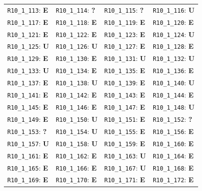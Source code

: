\begin{longtable}{llll}
\texttt{R10\_1\_113}: \textbf{E} & \texttt{R10\_1\_114}: \textbf{?} & \texttt{R10\_1\_115}: \textbf{?} & \texttt{R10\_1\_116}: \textbf{U} \\
\texttt{R10\_1\_117}: \textbf{E} & \texttt{R10\_1\_118}: \textbf{E} & \texttt{R10\_1\_119}: \textbf{E} & \texttt{R10\_1\_120}: \textbf{E} \\
\texttt{R10\_1\_121}: \textbf{E} & \texttt{R10\_1\_122}: \textbf{E} & \texttt{R10\_1\_123}: \textbf{E} & \texttt{R10\_1\_124}: \textbf{U} \\
\texttt{R10\_1\_125}: \textbf{U} & \texttt{R10\_1\_126}: \textbf{U} & \texttt{R10\_1\_127}: \textbf{E} & \texttt{R10\_1\_128}: \textbf{E} \\
\texttt{R10\_1\_129}: \textbf{E} & \texttt{R10\_1\_130}: \textbf{E} & \texttt{R10\_1\_131}: \textbf{U} & \texttt{R10\_1\_132}: \textbf{U} \\
\texttt{R10\_1\_133}: \textbf{U} & \texttt{R10\_1\_134}: \textbf{E} & \texttt{R10\_1\_135}: \textbf{E} & \texttt{R10\_1\_136}: \textbf{E} \\
\texttt{R10\_1\_137}: \textbf{E} & \texttt{R10\_1\_138}: \textbf{U} & \texttt{R10\_1\_139}: \textbf{E} & \texttt{R10\_1\_140}: \textbf{U} \\
\texttt{R10\_1\_141}: \textbf{E} & \texttt{R10\_1\_142}: \textbf{E} & \texttt{R10\_1\_143}: \textbf{E} & \texttt{R10\_1\_144}: \textbf{E} \\
\texttt{R10\_1\_145}: \textbf{E} & \texttt{R10\_1\_146}: \textbf{E} & \texttt{R10\_1\_147}: \textbf{E} & \texttt{R10\_1\_148}: \textbf{U} \\
\texttt{R10\_1\_149}: \textbf{E} & \texttt{R10\_1\_150}: \textbf{U} & \texttt{R10\_1\_151}: \textbf{E} & \texttt{R10\_1\_152}: \textbf{?} \\
\texttt{R10\_1\_153}: \textbf{?} & \texttt{R10\_1\_154}: \textbf{U} & \texttt{R10\_1\_155}: \textbf{E} & \texttt{R10\_1\_156}: \textbf{E} \\
\texttt{R10\_1\_157}: \textbf{U} & \texttt{R10\_1\_158}: \textbf{U} & \texttt{R10\_1\_159}: \textbf{E} & \texttt{R10\_1\_160}: \textbf{E} \\
\texttt{R10\_1\_161}: \textbf{E} & \texttt{R10\_1\_162}: \textbf{E} & \texttt{R10\_1\_163}: \textbf{U} & \texttt{R10\_1\_164}: \textbf{E} \\
\texttt{R10\_1\_165}: \textbf{E} & \texttt{R10\_1\_166}: \textbf{E} & \texttt{R10\_1\_167}: \textbf{U} & \texttt{R10\_1\_168}: \textbf{E} \\
\texttt{R10\_1\_169}: \textbf{E} & \texttt{R10\_1\_170}: \textbf{E} & \texttt{R10\_1\_171}: \textbf{E} & \texttt{R10\_1\_172}: \textbf{E} \\

\end{longtable}
